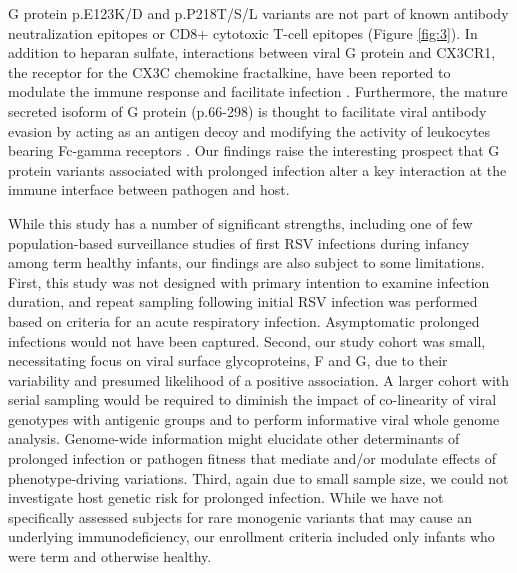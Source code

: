 \documentclass{article} %
\begin{document}
G protein p.E123K/D and p.P218T/S/L variants are not part of known antibody neutralization epitopes or CD8+ cytotoxic T-cell epitopes (Figure \ref{fig:3}). In addition to heparan sulfate, interactions between viral G protein and CX3CR1, the receptor for the CX3C chemokine fractalkine, have been reported to modulate the immune response and facilitate infection
\citep{levine1987demonstration, feldman1999identification, feldman2000fusion, johnson2015respiratory, tripp2001cx3c, jeong2015cx3cr1}.
Furthermore, the mature secreted isoform of G protein (p.66-298) is thought to facilitate viral antibody evasion by acting as an antigen decoy and modifying the activity of leukocytes bearing Fc-gamma receptors \citep{bukreyev2008secreted}. Our findings raise the interesting prospect that G protein variants associated with prolonged infection alter a key interaction at the immune interface between pathogen and host.

While this study has a number of significant strengths, including one of few population-based surveillance studies of first RSV infections during infancy among term healthy infants, our findings are also subject to some limitations. First, this study was not designed with primary intention to examine infection duration, and repeat sampling following initial RSV infection was performed based on criteria for an acute respiratory infection. Asymptomatic prolonged infections would not have been captured. Second, our study cohort was small, necessitating focus on viral surface glycoproteins, F and G, due to their variability and presumed likelihood of a positive association. A larger cohort with serial sampling would be required to diminish the impact of co-linearity of viral genotypes with antigenic groups and to perform informative viral whole genome analysis. Genome-wide information might elucidate other determinants of prolonged infection or pathogen fitness that mediate and/or modulate effects of phenotype-driving variations. Third, again due to small sample size, we could not investigate host genetic risk for prolonged infection. While we have not specifically assessed subjects for rare monogenic variants that may cause an underlying immunodeficiency, our enrollment criteria included only infants who were term and otherwise healthy. 
\end{document}
